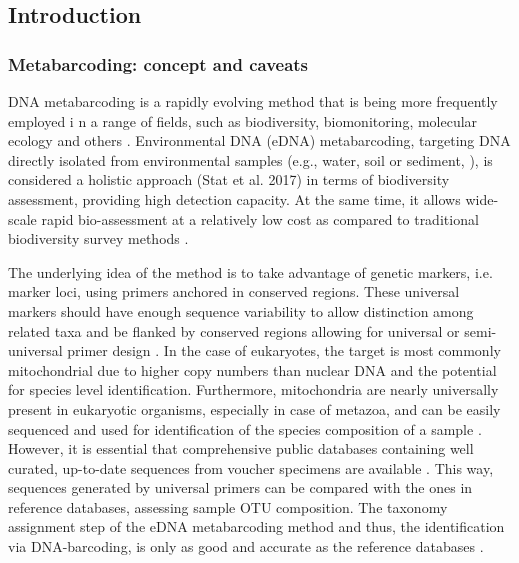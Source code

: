    \subsection{Introduction}
   \label{sec:darn-intro}

   \subsubsection*{Metabarcoding: concept and caveats}
   \label{subsec:darn-intro-metabar}

   DNA metabarcoding is a rapidly evolving method that is being more frequently employed i
   n a range of fields, such as biodiversity, biomonitoring, molecular ecology and others 
   \cite{deiner2017environmental, ruppert2019past}. 
   Environmental DNA (eDNA) metabarcoding, targeting DNA directly isolated from environmental samples
   (e.g., water, soil or sediment, \cite{taberlet2012environmental}), is considered a holistic approach 
   (Stat et al. 2017) in terms of biodiversity assessment, providing high detection capacity. 
   At the same time, it allows wide-scale rapid bio-assessment \cite{stat2017ecosystem} at a relatively
   low cost as compared to traditional biodiversity survey methods \cite{ji2013reliable}.

   The underlying idea of the method is to take advantage of genetic markers, i.e. marker loci, 
   using primers anchored in conserved regions. 
   These universal markers should have enough sequence variability to allow distinction among 
   related taxa and be flanked by conserved regions allowing for universal or semi-universal primer design \cite{deagle2014dna}. 
   In the case of eukaryotes, the target is most commonly mitochondrial due to higher copy numbers than nuclear DNA and the potential for species level identification. 
   Furthermore, mitochondria are nearly universally present in eukaryotic organisms, especially in case of metazoa, and can be easily sequenced and used for identification of the species composition of a sample \cite{taberlet2012towards}. 
   However, it is essential that comprehensive public databases containing well curated, up-to-date sequences from voucher specimens are available \cite{schenekar2020reference}. 
   This way, sequences generated by universal primers can be compared with the ones in reference databases, assessing sample OTU composition. 
   The taxonomy assignment step of the eDNA metabarcoding method and thus, the identification via DNA-barcoding, is only as good and accurate as the reference databases \cite{cilleros2019unlocking}. 

